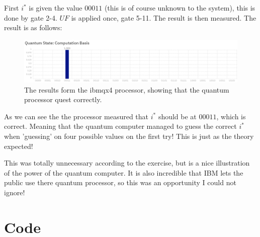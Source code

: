 \documentclass[a4paper,norsk, 10pt]{article}
\begin{document}
First $i^*$ is given the value $00011$ (this is of course unknown to the system), this is done by gate 2-4. $UF$ is applied once, gate 5-11. The result is then measured. The result is as follows:

\begin{figure}[H]
\centering
\includegraphics[scale=0.4]{IBMresultat.png}
\caption{The results form the ibmqx4 processor, showing that the quantum processor quest correctly.}
\end{figure}

As we can see the the processor measured that $i^*$ should be at $00011$, which is correct. Meaning that the quantum computer managed to guess the correct $i^*$ when 'guessing' on four possible values on the first try!  This is just as the theory expected!

This was totally unnecessary according to the exercise, but is a nice illustration of the power of the quantum computer. It is also incredible that IBM lets the public use there quantum processor, so this was an opportunity I could not ignore!
\section{Code}\label{sec:code}




\end{document}
